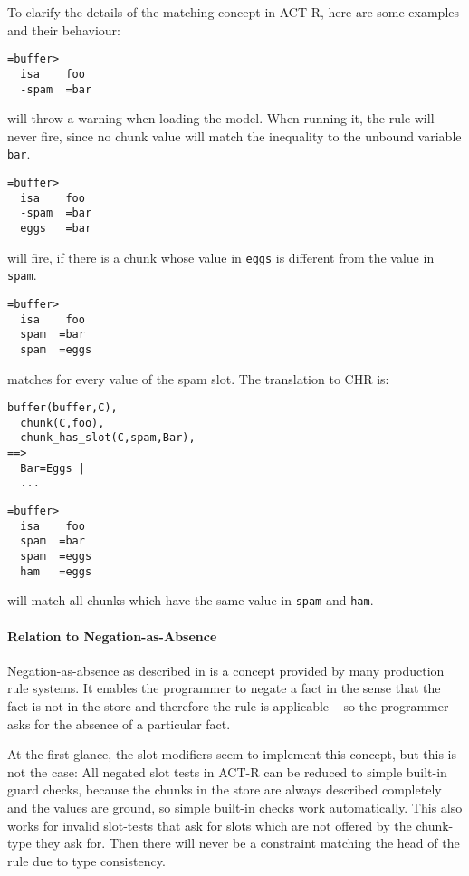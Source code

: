 \begin{example}
To clarify the details of the matching concept in ACT-R, here are some examples and their behaviour:

\begin{lstlisting}
=buffer>
  isa    foo
  -spam  =bar
\end{lstlisting}

will throw a warning when loading the model. When running it, the rule will never fire, since no chunk value will match the inequality to the unbound variable \verb|bar|.

\begin{lstlisting}
=buffer>
  isa    foo
  -spam  =bar
  eggs   =bar
\end{lstlisting}

will fire, if there is a chunk whose value in \verb|eggs| is different from the value in \verb|spam|.

\begin{lstlisting}
=buffer>
  isa    foo
  spam  =bar
  spam  =eggs
\end{lstlisting}

matches for every value of the spam slot. The translation to CHR is:

\begin{lstlisting}
buffer(buffer,C),
  chunk(C,foo),
  chunk_has_slot(C,spam,Bar),
==>
  Bar=Eggs |
  ...
\end{lstlisting}

\begin{lstlisting}
=buffer>
  isa    foo
  spam  =bar
  spam  =eggs
  ham   =eggs
\end{lstlisting}

will match all chunks which have the same value in \verb|spam| and \verb|ham|. 

\end{example}

\paragraph{Relation to Negation-as-Absence}

Negation-as-absence as described in \cite[147\psqq]{fru_chr_book_2009} is a concept provided by many production rule systems. It enables the programmer to negate a fact in the sense that the fact is not in the store and therefore the rule is applicable -- so the programmer asks for the absence of a particular fact.

At the first glance, the slot modifiers seem to implement this concept, but this is not the case: All negated slot tests in ACT-R can be reduced to simple built-in guard checks, because the chunks in the store are always described completely and the values are ground, so simple built-in checks work automatically. This also works for invalid slot-tests that ask for slots which are not offered by the chunk-type they ask for. Then there will never be a constraint matching the head of the rule due to type consistency.

